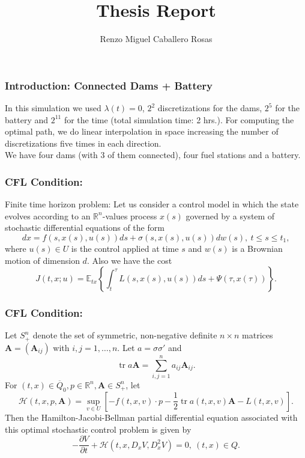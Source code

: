 \documentclass[aspectratio=169]{beamer}\usepackage[utf8]{inputenc}
\title{Thesis Report}
\subtitle{Renzo Miguel Caballero Rosas}
\DeclareMathOperator{\tr}{tr}
\newcommand{\R}{\mathbb{R}}
\newcommand{\E}{\mathbb{E}}
\begin{document}
\begin{frame}
\titlepage
\end{frame}

\begin{frame}\frametitle{Introduction: Connected Dams + Battery}
In this simulation we used $\lambda(t)=0$, $2^2$ discretizations for the dams, $2^5$ for the battery and $2^{11}$ for the time (total simulation time: 2 hrs.). For computing the optimal path, we do linear interpolation in space increasing the number of discretizations five times in each direction.\\
We have four dams (with 3 of them connected), four fuel stations and a battery.
\begin{figure}[ht!]
\centering
{}
\end{figure}
\end{frame}

\begin{frame}\frametitle{CFL Condition:}
Finite time horizon problem: Let us consider a control model in which the state evolves according to an $\R^n$-values process $x(s)$ governed by a system of stochastic differential equations of the form
\begin{equation*}
dx=f(s,x(s),u(s))ds+\sigma(s,x(s),u(s))dw(s),\ t\leq s\leq t_1,
\end{equation*}
where $u(s)\in U$ is the control applied at time $s$ and $w(s)$ is a Brownian motion of dimension $d$. Also we have the cost 
\begin{equation*}
J(t,x;u)=\E_{tx}\left\{\int_t^\tau L(s,x(s),u(s))ds+\Psi(\tau,x(\tau))\right\}.
\end{equation*}
\end{frame}

\begin{frame}\frametitle{CFL Condition:}
Let $S_+^n$ denote the set of symmetric, non-negative definite $n\times n$ matrices $\bm{A}=(\bm{A}_{ij})$ with $i,j=1,\dots,n$. Let $a=\sigma\sigma'$ and
\begin{equation*}
\tr a\bm{A}=\sum_{i,j=1}^na_{ij}\bm{A}_{ij}.
\end{equation*}
For $(t,x)\in\overline{Q}_0,p\in\R^n,\bm{A}\in S^n_+$, let
\begin{equation*}
\mathcal{H}(t,x,p,\bm{A})=\sup_{v\in U}\left[-f(t,x,v)\cdot p-\frac{1}{2}\tr a(t,x,v)\bm{A}-L(t,x,v)\right].
\end{equation*}
Then the Hamilton-Jacobi-Bellman partial differential equation associated with this optimal stochastic control problem is given by
\begin{equation*}
-\frac{\partial V}{\partial t}+\mathcal{H}(t,x,D_xV,D^2_xV)=0,\ (t,x)\in Q.
\end{equation*}
\end{frame}
\end{document}
